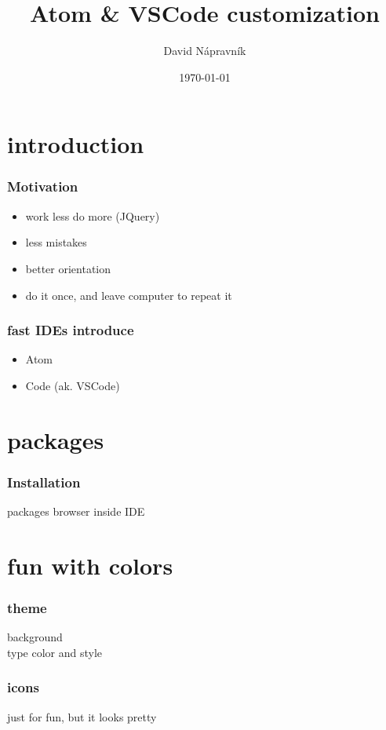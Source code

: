 \documentclass{beamer}
\title[Short title]{Atom \& VSCode customization} %
\author{David Nápravník} %
\institute[mff] %
{
Charles University \\ %
\medskip
\textit{ebrithil@nogare.cz} %
}
\date{\today} %
\begin{document}
\begin{frame}
\titlepage %
\end{frame}


\section{introduction}

\begin{frame}
\frametitle{Motivation}
\begin{itemize}
\item work less do more (JQuery)
\item less mistakes
\item better orientation
\item do it once, and leave computer to repeat it
\end{itemize}


\end{frame}

\begin{frame}
\frametitle{fast IDEs introduce}
\begin{itemize}
\item Atom
\item Code (ak. VSCode)
\end{itemize}
\end{frame}

\section{packages}
\begin{frame}
\frametitle{Installation}
packages browser inside IDE\\
\end{frame}


\section{fun with colors}
\begin{frame}
\frametitle{theme}
background\\
type color and style
\end{frame}

\begin{frame}
\frametitle{icons}
just for fun, but it looks pretty
\end{frame}
\end{document}
